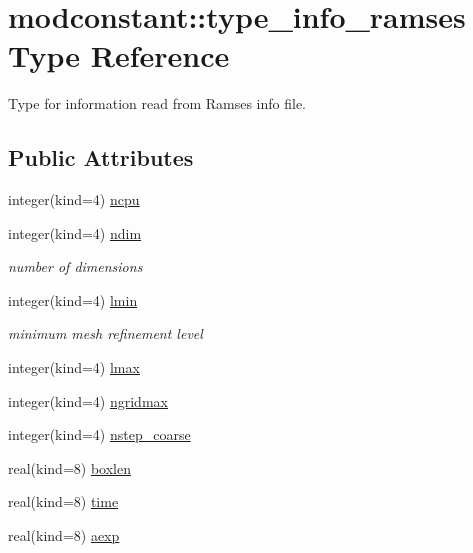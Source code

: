 \hypertarget{structmodconstant_1_1type__info__ramses}{\section{modconstant\-:\-:type\-\_\-info\-\_\-ramses Type Reference}
\label{structmodconstant_1_1type__info__ramses}
}


Type for information read from Ramses info file.  


\subsection*{Public Attributes}
\begin{DoxyCompactItemize}
\item 
integer(kind=4) \hyperlink{structmodconstant_1_1type__info__ramses_a9ad0413ab7cfb052b2fd0c118b3813d3}{ncpu}
\item 
integer(kind=4) \hyperlink{structmodconstant_1_1type__info__ramses_a66b83ff734472dc468970e94097b4a86}{ndim}
\begin{DoxyCompactList}\small\item\em number of dimensions \end{DoxyCompactList}\item 
integer(kind=4) \hyperlink{structmodconstant_1_1type__info__ramses_aa30239d0b6e8821249fcf079837a5f39}{lmin}
\begin{DoxyCompactList}\small\item\em minimum mesh refinement level \end{DoxyCompactList}\item 
integer(kind=4) \hyperlink{structmodconstant_1_1type__info__ramses_a380293f72c7f9e4d25dd6dc31435a012}{lmax}
\item 
integer(kind=4) \hyperlink{structmodconstant_1_1type__info__ramses_a9fe8aabf1664b5cc578a7dbdb0b33fe4}{ngridmax}
\item 
integer(kind=4) \hyperlink{structmodconstant_1_1type__info__ramses_a0ca1ca782af8a086821dde9da5be5812}{nstep\-\_\-coarse}
\item 
real(kind=8) \hyperlink{structmodconstant_1_1type__info__ramses_ae0e48e2f8d3ecbb0f6f2b4a75a0bed46}{boxlen}
\item 
real(kind=8) \hyperlink{structmodconstant_1_1type__info__ramses_adc56fe5d020573066203da42ac039409}{time}
\item 
real(kind=8) \hyperlink{structmodconstant_1_1type__info__ramses_aa5bf5f6d4b93838d3afe609352e84640}{aexp}

\end{DoxyCompactItemize}
